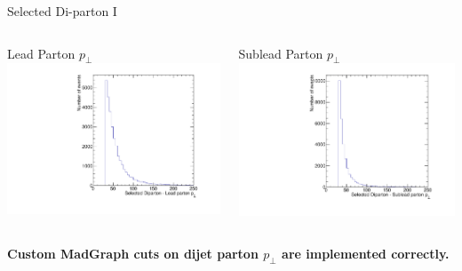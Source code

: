 \documentclass[8pt]{beamer}
\begin{document}
\begin{frame}{Selected Di-parton I}

\begin{columns}

  \centering

  \begin{block}{Lead Parton $p_\perp$}
    \centering
    \includegraphics[width=0.8\linewidth]{img/SelDiParton_Parton1_Pt.pdf}
  \end{block}
  
  \centering

  \begin{block}{Sublead Parton $p_\perp$}
    \centering
    \includegraphics[width=0.8\linewidth]{img/SelDiParton_Parton2_Pt.pdf}
  \end{block}

\end{columns}

\begin{center}
\textbf{Custom MadGraph cuts on dijet parton $p_\perp$ are implemented correctly.}
\end{center}

\end{frame}
\end{document}

